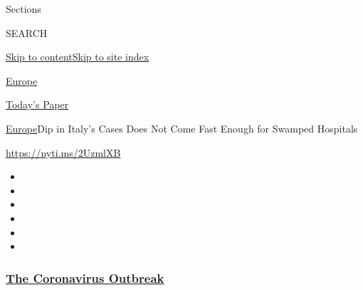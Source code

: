Sections

SEARCH

\protect\hyperlink{site-content}{Skip to
content}\protect\hyperlink{site-index}{Skip to site index}

\href{https://www.nytimes3xbfgragh.onion/section/world/europe}{Europe}

\href{https://myaccount.nytimes3xbfgragh.onion/auth/login?response_type=cookie\&client_id=vi}{}

\href{https://www.nytimes3xbfgragh.onion/section/todayspaper}{Today's
Paper}

\href{/section/world/europe}{Europe}\textbar{}Dip in Italy's Cases Does
Not Come Fast Enough for Swamped Hospitals

\url{https://nyti.ms/2UzmlXB}

\begin{itemize}
\item
\item
\item
\item
\item
\item
\end{itemize}

\hypertarget{the-coronavirus-outbreak}{%
\subsubsection{\texorpdfstring{\href{https://www.nytimes3xbfgragh.onion/news-event/coronavirus?name=styln-coronavirus-national\&region=TOP_BANNER\&block=storyline_menu_recirc\&action=click\&pgtype=Article\&impression_id=6fe7a8f0-efba-11ea-b9e2-fd85e1bd9bd3\&variant=undefined}{The
Coronavirus
Outbreak}}{The Coronavirus Outbreak}}\label{the-coronavirus-outbreak}}

